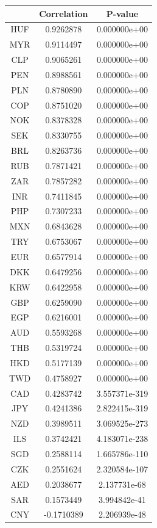 \documentclass[11pt,preprint, authoryear]{elsarticle}
\let\origtable\table
\let\endorigtable\endtable
\renewenvironment{table}[1][2] {
    \expandafter\origtable\expandafter[H]
} {
    \endorigtable
}
\numberwithin{equation}{section}
\numberwithin{figure}{section}
\numberwithin{table}{section}
\begin{document}
\begin{table}
\begin{center}
\begin{tabular}{|c|c|c|} 
 \hline
 & Correlation & P-value  \\
 \hline
 HUF & 0.9262878 & 0.000000e+00 \\
 MYR & 0.9114497 & 0.000000e+00 \\
 CLP & 0.9065261 & 0.000000e+00 \\
 PEN & 0.8988561 & 0.000000e+00 \\
 PLN & 0.8780890 & 0.000000e+00 \\
 COP & 0.8751020 & 0.000000e+00 \\
 NOK & 0.8378328 & 0.000000e+00 \\
 SEK & 0.8330755 & 0.000000e+00 \\
 BRL & 0.8263736 & 0.000000e+00 \\
 RUB & 0.7871421 & 0.000000e+00 \\
 ZAR & 0.7857282 & 0.000000e+00 \\
 INR & 0.7411845 & 0.000000e+00 \\
 PHP & 0.7307233 & 0.000000e+00 \\
 MXN & 0.6843628 & 0.000000e+00 \\ 
 TRY & 0.6753067 & 0.000000e+00 \\
 EUR & 0.6577914 & 0.000000e+00 \\
 DKK & 0.6479256 & 0.000000e+00 \\
 KRW & 0.6422958 & 0.000000e+00 \\
 GBP & 0.6259090 & 0.000000e+00 \\
 EGP & 0.6216001 & 0.000000e+00 \\
 AUD & 0.5593268 & 0.000000e+00 \\
 THB & 0.5319724 & 0.000000e+00 \\
 HKD & 0.5177139 & 0.000000e+00 \\
 TWD & 0.4758927 & 0.000000e+00 \\
 CAD & 0.4283742 & 3.557371e-319 \\
 JPY & 0.4241386 & 2.822415e-319 \\
 NZD & 0.3989511 & 3.069525e-273 \\
 ILS & 0.3742421 & 4.183071e-238 \\
 SGD & 0.2588114 & 1.665786e-110 \\
 CZK & 0.2551624 & 2.320584e-107 \\
 AED & 0.2038677 & 2.137731e-68 \\
 SAR & 0.1573449 & 3.994842e-41 \\
 CNY & -0.1710389 & 2.206939e-48 \\
\hline
\end{tabular}
\caption{Correlation and P-value for the first principal component }
 \label{pca1}
\end{center}
\end{table}
\end{document}
